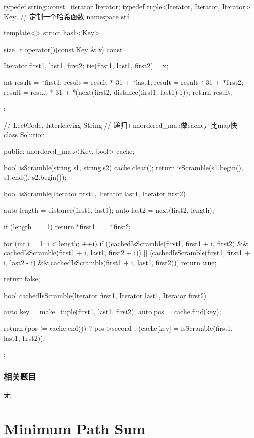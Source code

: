 \begin{Code}
typedef string::const_iterator Iterator;
typedef tuple<Iterator, Iterator, Iterator> Key;
// 定制一个哈希函数
namespace std {
template<> struct hash<Key> {
    size_t operator()(const Key & x) const {
        Iterator first1, last1, first2;
        tie(first1, last1, first2) = x;

        int result = *first1;
        result = result * 31 + *last1;
        result = result * 31 + *first2;
        result = result * 31 + *(next(first2, distance(first1, last1)-1));
        return result;
    }
};
}

// LeetCode, Interleaving String
// 递归+unordered_map做cache，比map快
class Solution {
public:
    unordered_map<Key, bool> cache;

    bool isScramble(string s1, string s2) {
        cache.clear();
        return isScramble(s1.begin(), s1.end(), s2.begin());
    }

    bool isScramble(Iterator first1, Iterator last1, Iterator first2) {
        auto length = distance(first1, last1);
        auto last2 = next(first2, length);

        if (length == 1)
            return *first1 == *first2;

        for (int i = 1; i < length; ++i)
            if ((cachedIsScramble(first1, first1 + i, first2)
                    && cachedIsScramble(first1 + i, last1, first2 + i))
                    || (cachedIsScramble(first1, first1 + i, last2 - i)
                            && cachedIsScramble(first1 + i, last1, first2)))
                return true;

        return false;
    }

    bool cachedIsScramble(Iterator first1, Iterator last1, Iterator first2) {
        auto key = make_tuple(first1, last1, first2);
        auto pos = cache.find(key);

        return (pos != cache.end()) ?
                pos->second : (cache[key] = isScramble(first1, last1, first2));
    }
};
\end{Code}


\subsubsection{相关题目}
\begindot
\item 无
\myenddot


\section{Minimum Path Sum} %
\label{sec:minimum-path-sum}


